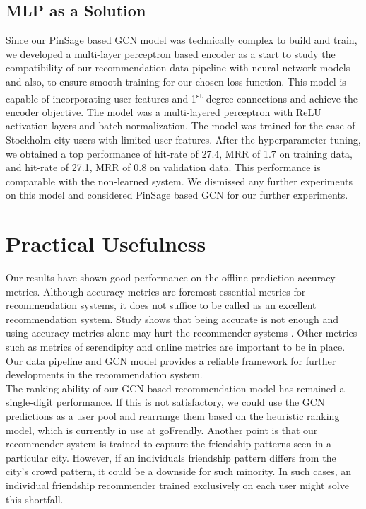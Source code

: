 \documentclass{kththesis}
\begin{document}
\subsection{MLP as a Solution}
Since our PinSage based GCN model was technically complex to build and train, we developed a multi-layer perceptron based encoder as a start to study the compatibility of our recommendation data pipeline with neural network models and also, to ensure smooth training for our chosen loss function. This model is capable of incorporating user features and 1\textsuperscript{st} degree connections and achieve the encoder objective. The model was a multi-layered perceptron with ReLU activation layers and batch normalization. The model was trained for the case of Stockholm city users with limited user features. After the hyperparameter tuning, we obtained a top performance of hit-rate of 27.4, MRR of 1.7 on training data, and hit-rate of 27.1, MRR of 0.8 on validation data. This performance is comparable with the non-learned system. We dismissed any further experiments on this model and considered PinSage based GCN for our further experiments.

\section{Practical Usefulness}
Our results have shown good performance on the offline prediction accuracy metrics. Although accuracy metrics are foremost essential metrics for recommendation systems, it does not suffice to be called as an excellent recommendation system. Study shows that being accurate is not enough and using accuracy metrics alone may hurt the recommender systems \cite{sean}. Other metrics such as metrics of serendipity and online metrics are important to be in place. Our data pipeline and GCN model provides a reliable framework for further developments in the recommendation system. \\

The ranking ability of our GCN based recommendation model has remained a single-digit performance. If this is not satisfactory, we could use the GCN predictions as a user pool and rearrange them based on the heuristic ranking model, which is currently in use at goFrendly. Another point is that our recommender system is trained to capture the friendship patterns seen in a particular city. However, if an individuals friendship pattern differs from the city's crowd pattern, it could be a downside for such minority. In such cases, an individual friendship recommender trained exclusively on each user might solve this shortfall.
\end{document}
